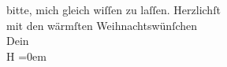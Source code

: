 \begin{ledgroupsized}[t]{13cm}
               bitte, mich gleich wiſſen zu laſſen.\pend
           \pstart
           Herzlichſt{\\[\baselineskip]}mit den wärmſten Weihnachtswünſchen{\\[\baselineskip]}Dein{\\[\baselineskip]}\spacefill\mbox{H}\pend
           \leftskip=0em{}
         
         \endnumbering{}\end{ledgroupsized}  \newcommand{\dateiname}{L01744}\newcommand{\titel}{Hermann Bahr an Arthur Schnitzler, 23. 12. 1907}\newcommand{\editorInnen}{ Kurt Ifkovits,  Martin Anton Müller}
      